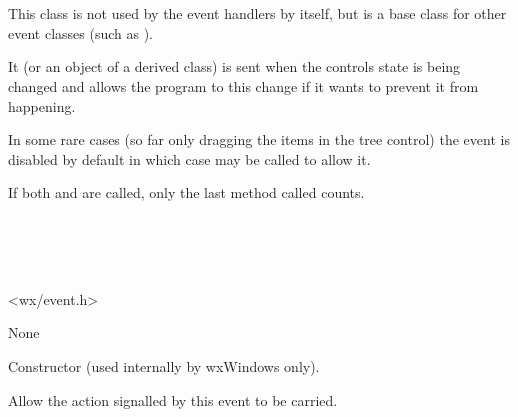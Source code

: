 \section{}\label{wxnotifyevent}

This class is not used by the event handlers by itself, but is a base class
for other event classes (such as ).

It (or an object of a derived class) is sent when the controls state is being
changed and allows the program to  this
change if it wants to prevent it from happening.

In some rare cases (so far only dragging the items in the tree control) the
event is disabled by default in which case 
 may be called to allow it.

If both  and 
 are called, only the last method called
counts.


\\
\\
\\


<wx/event.h>


None




\label{wxnotifyeventconstr}


Constructor (used internally by wxWindows only).

\label{wxnotifyeventallow}


Allow the action signalled by this event to be carried.

\label{wxnotifyeventisallowed}

